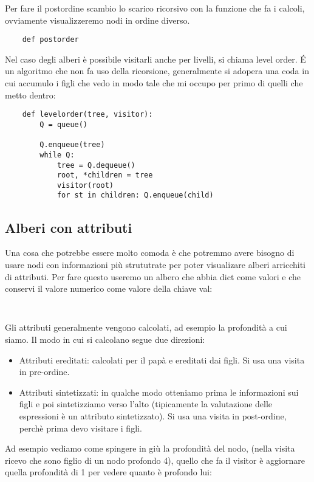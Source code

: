 Per fare il postordine scambio lo scarico ricorsivo con la funzione che fa i calcoli, ovviamente visualizzeremo nodi in ordine diverso.
\begin{lstlisting}
    def postorder
\end{lstlisting}

Nel caso degli alberi è possibile visitarli anche per livelli, si chiama level order. \'E un algoritmo che non fa uso della ricorsione, generalmente si adopera una coda in cui accumulo i figli che vedo in modo tale che mi occupo per primo di quelli che metto dentro:

\begin{lstlisting}
    def levelorder(tree, visitor):
        Q = queue()

        Q.enqueue(tree)
        while Q:
            tree = Q.dequeue()
            root, *children = tree
            visitor(root)
            for st in children: Q.enqueue(child)
\end{lstlisting}

\subsection{Alberi con attributi}

Una cosa che potrebbe essere molto comoda è che potremmo avere bisogno di usare nodi con informazioni più strututrate per poter visualizare alberi arricchiti di attributi. Per fare questo useremo un albero che abbia dict come valori e che conservi il valore numerico come valore della chiave val:
\begin{lstlisting}
    
\end{lstlisting} 

Gli attributi generalmente vengono calcolati, ad esempio la profondità a cui siamo. Il modo in cui si calcolano segue due direzioni:
\begin{itemize}
    \item Attributi ereditati: calcolati per il papà e ereditati dai figli. Si usa una visita in pre-ordine.
    \item Attributi sintetizzati: in qualche modo otteniamo prima le informazioni sui figli e poi sintetizziamo verso l'alto (tipicamente la valutazione delle espressioni è un attributo sintetizzato). Si usa una visita in post-ordine, perchè prima devo visitare i figli.
\end{itemize}

Ad esempio vediamo come spingere in giù la profondità del nodo, (nella visita ricevo che sono figlio di un nodo profondo 4), quello che fa il visitor è aggiornare quella profondità di 1 per vedere quanto è profondo lui:
\begin{lstlisting}
    
\end{lstlisting}

